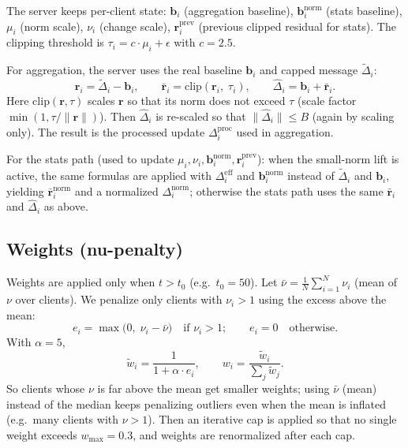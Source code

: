 \documentclass[11pt,a4paper]{article}
\begin{document}
The server keeps per-client state: $\mathbf{b}_i$ (aggregation baseline), $\mathbf{b}_i^{\mathrm{norm}}$ (stats baseline), $\mu_i$ (norm scale), $\nu_i$ (change scale), $\mathbf{r}_i^{\mathrm{prev}}$ (previous clipped residual for stats). The clipping threshold is $\tau_i = c \cdot \mu_i + \epsilon$ with $c = 2.5$.

For aggregation, the server uses the real baseline $\mathbf{b}_i$ and capped message $\widetilde{\Delta}_i$:
\begin{equation}
  \mathbf{r}_i = \widetilde{\Delta}_i - \mathbf{b}_i, \qquad
  \bar{\mathbf{r}}_i = \mathrm{clip}(\mathbf{r}_i,\; \tau_i), \qquad
  \widehat{\Delta}_i = \mathbf{b}_i + \bar{\mathbf{r}}_i.
\end{equation}
Here $\mathrm{clip}(\mathbf{r},\tau)$ scales $\mathbf{r}$ so that its norm does not exceed $\tau$ (scale factor $\min(1, \tau/\|\mathbf{r}\|)$). Then $\widehat{\Delta}_i$ is re-scaled so that $\|\widehat{\Delta}_i\| \le B$ (again by scaling only). The result is the processed update $\Delta_i^{\mathrm{proc}}$ used in aggregation.

For the stats path (used to update $\mu_i,\nu_i,\mathbf{b}_i^{\mathrm{norm}},\mathbf{r}_i^{\mathrm{prev}}$): when the small-norm lift is active, the same formulas are applied with $\Delta_i^{\mathrm{eff}}$ and $\mathbf{b}_i^{\mathrm{norm}}$ instead of $\widetilde{\Delta}_i$ and $\mathbf{b}_i$, yielding $\bar{\mathbf{r}}_i^{\mathrm{norm}}$ and a normalized $\Delta_i^{\mathrm{norm}}$; otherwise the stats path uses the same $\bar{\mathbf{r}}_i$ and $\widehat{\Delta}_i$ as above.

\subsection{Weights (nu-penalty)}
\label{sec:weights}

Weights are applied only when $t > t_0$ (e.g.\ $t_0 = 50$). Let $\bar{\nu} = \frac{1}{N}\sum_{i=1}^N \nu_i$ (mean of $\nu$ over clients). We penalize only clients with $\nu_i > 1$ using the excess above the mean:
\begin{equation}
  e_i = \max\bigl(0,\; \nu_i - \bar{\nu}\bigr) \quad \text{if }\nu_i > 1;\qquad e_i = 0 \quad \text{otherwise}.
\end{equation}
With $\alpha = 5$,
\begin{equation}
  \tilde{w}_i = \frac{1}{1 + \alpha \cdot e_i}, \qquad
  w_i = \frac{\tilde{w}_i}{\sum_j \tilde{w}_j}.
\end{equation}
So clients whose $\nu$ is far above the mean get smaller weights; using $\bar{\nu}$ (mean) instead of the median keeps penalizing outliers even when the mean is inflated (e.g.\ many clients with $\nu > 1$). Then an iterative cap is applied so that no single weight exceeds $w_{\max} = 0.3$, and weights are renormalized after each cap.
\end{document}
